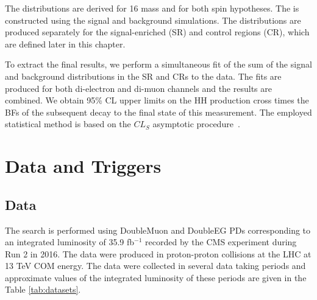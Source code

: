 The \mTHH distributions are derived for 16 mass and for both spin hypotheses. The \mTHH is constructed using the signal and background simulations. The distributions are produced separately for the signal-enriched (SR) and control regions (CR), which are defined later in this chapter.

To extract the final results, we perform a simultaneous fit of the sum of the signal and background \mTHH distributions in the SR and CRs to the data. The fits are produced for both di-electron and di-muon channels and the results are combined. We obtain 95\% CL upper limits on the HH production cross times the BFs of the subsequent decay to the final state of this measurement. The employed statistical method is based on the $CL_{S}$ asymptotic procedure~\cite{Zech:1988un}.



\section{Data and Triggers}
\label{sec:data_and_triggers}

\subsection{Data}
The search is performed using DoubleMuon and DoubleEG PDs corresponding to an integrated luminosity of 35.9 fb$^{-1}$ recorded by the CMS experiment during Run 2 in 2016. The data were produced in proton-proton collisions at the LHC at 13 TeV COM energy. The data were collected in several data taking periods and approximate values of the integrated luminosity of these periods are given in the Table \ref{tab:datasets}.


